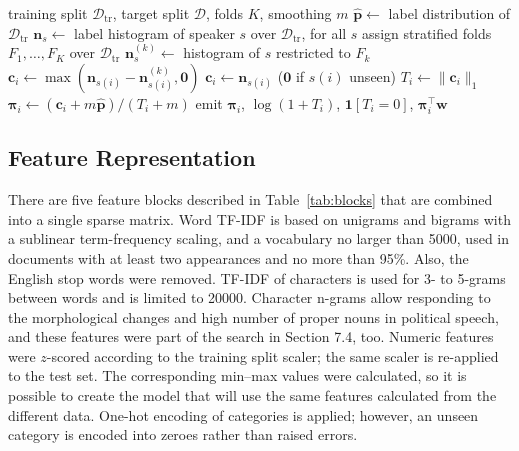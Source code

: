 \documentclass[10pt,twocolumn,twoside,a4paper]{article}
\newcommand{\bs}[1]{\boldsymbol{#1}}
\begin{document}
\begin{algorithm}[t]
\caption{Leakage-free speaker credit history}
\label{alg:history}
\begin{algorithmic}[1]
\Require training split $\mathcal{D}_{\text{tr}}$, target split $\mathcal{D}$,
 folds $K$, smoothing $m$
\State $\hat{\bs{p}} \gets$ label distribution of $\mathcal{D}_{\text{tr}}$
\State $\bs{n}_s \gets$ label histogram of speaker $s$ over
 $\mathcal{D}_{\text{tr}}$, for all $s$
  \State assign stratified folds $F_1,\dots,F_K$ over $\mathcal{D}_{\text{tr}}$
    \State $\bs{n}^{(k)}_s \gets$ histogram of $s$ restricted to $F_k$
      \State $\bs{c}_i \gets \max(\bs{n}_{s(i)} - \bs{n}^{(k)}_{s(i)}, \bs{0})$
    \EndFor
  \EndFor
\Else
    \State $\bs{c}_i \gets \bs{n}_{s(i)}$ \quad ($\bs{0}$ if $s(i)$ unseen)
  \EndFor
\EndIf
{}
  \State $T_i \gets \|\bs{c}_i\|_1$
  \State $\bs{\pi}_i \gets (\bs{c}_i + m\hat{\bs{p}})/(T_i + m)$
  \State emit $\bs{\pi}_i$, $\log(1+T_i)$, $\mathbf{1}[T_i = 0]$,
   $\bs{\pi}_i^{\!\top}\bs{w}$
\EndFor
\end{algorithmic}
\end{algorithm}

\subsection{Feature Representation}

There are five feature blocks described in Table~\ref{tab:blocks} that are combined into a single sparse matrix. Word TF-IDF is based on unigrams and bigrams with a sublinear term-frequency scaling, and a vocabulary no larger than 5000, used in documents with at least two appearances and no more than 95\%. Also, the English stop words were removed. TF-IDF of characters is used for 3- to 5-grams between words and is limited to 20000. Character n-grams allow responding to the morphological changes and high number of proper nouns in political speech, and these features were part of the search in Section 7.4, too. Numeric features were $z$-scored according to the training split scaler; the same scaler is re-applied to the test set. The corresponding min--max values were calculated, so it is possible to create the model that will use the same features calculated from the different data. One-hot encoding of categories is applied; however, an unseen category is encoded into zeroes rather than raised errors.
\end{document}
